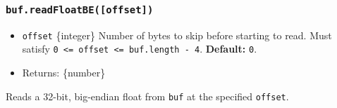 \begin{Shaded}
\begin{Highlighting}[]
\NormalTok{ \{ }\NormalTok{ \} }\OperatorTok{=} \NormalTok{(}\NormalTok{)}\OperatorTok{;}

\OperatorTok{=} \NormalTok{([}\OperatorTok{,} \OperatorTok{,} \OperatorTok{,} \OperatorTok{,} \OperatorTok{,} \OperatorTok{,} \OperatorTok{,} \NormalTok{])}\OperatorTok{;}

\NormalTok{(}\NormalTok{))}\OperatorTok{;}
\NormalTok{(}\NormalTok{))}\OperatorTok{;}
\end{Highlighting}
\end{Shaded}

\subsubsection{\texorpdfstring{\texttt{buf.readFloatBE({[}offset{]})}}{buf.readFloatBE({[}offset{]})}}\label{buf.readfloatbeoffset}

\begin{itemize}
\tightlist
\item
  \texttt{offset} \{integer\} Number of bytes to skip before starting to
  read. Must satisfy
  \texttt{0\ \textless{}=\ offset\ \textless{}=\ buf.length\ -\ 4}.
  \textbf{Default:} \texttt{0}.
\item
  Returns: \{number\}
\end{itemize}

Reads a 32-bit, big-endian float from \texttt{buf} at the specified
\texttt{offset}.

\begin{Shaded}
\begin{Highlighting}[]
\NormalTok{ \{ }\NormalTok{ \} } \OperatorTok{;}

\OperatorTok{=} \NormalTok{([}\OperatorTok{,} \OperatorTok{,} \OperatorTok{,} \NormalTok{])}\OperatorTok{;}

\NormalTok{(}\NormalTok{))}\OperatorTok{;}
\end{Highlighting}
\end{Shaded}

